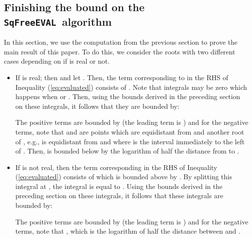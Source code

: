 \documentclass{amsart}
\theoremstyle{definition}
\newcommand{\EVAL}{\texttt{SqFreeEVAL}}
\begin{document}
\subsection{Finishing the bound on the \EVAL\ algorithm}\label{subsec:EVALbounds}
In this section, we use the computation from the previous section to prove the main result of this paper.  To do this, we consider the roots  with two different cases depending on if  is real or not.
\begin{itemize}
\item If  is real; then  and let .  Then, the term corresponding to  in the RHS of Inequality (\ref{eq:evaluated}) consists of .  Note that integrals may be zero which happens when  or .  Then, using the bounds derived in the preceding section on these integrals, it follows that they are bounded by:
    
    The positive terms are bounded by  (the leading term is ) and for the negative terms, note that  and  are points which are equidistant from  and another root of , e.g.,  is equidistant from  and  where  is the interval immediately to the left of .  Then,  is bounded below by the logarithm of half the distance from  to .
\item If  is not real, then the term corresponding  in the RHS of Inequality (\ref{eq:evaluated}) consists of  which is bounded above by .  By splitting this integral at , the integral is equal to . Using the bounds derived in the preceding section on these integrals, it follows that these integrals are bounded by:
    
    The positive terms are bounded by  (the leading term is ) and for the negative terms, note that , which is the logarithm of half the distance between  and .
\end{itemize}
\end{document}
